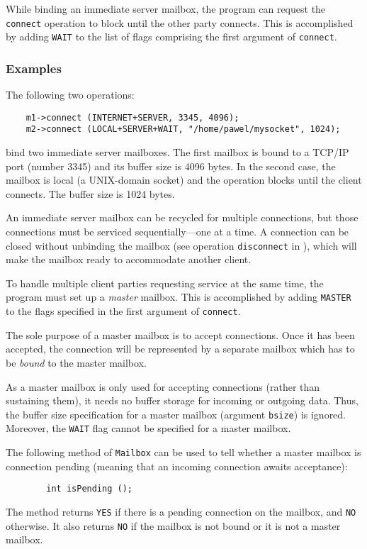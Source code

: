While binding an immediate server mailbox, the program can
request the {\tt connect} operation to block until the other party connects.
This is accomplished by adding {\tt WAIT} to the list of flags
comprising the first argument of {\tt connect}.

\subsubsection*{Examples}

\noindent
The following two operations:
\begin{verbatim}
    m1->connect (INTERNET+SERVER, 3345, 4096);
    m2->connect (LOCAL+SERVER+WAIT, "/home/pawel/mysocket", 1024);
\end{verbatim}
bind two immediate server mailboxes.
The first mailbox is bound to a TCP/IP port (number 3345) and its buffer
size is 4096 bytes.
In the second case, the mailbox is local (a UNIX-domain socket) and the
operation blocks until the client connects.
The buffer size is 1024 bytes.

\medskip

\noindent
An immediate server mailbox can be recycled for multiple connections,
but those connections must be serviced sequentially---one at a time.
A connection can be closed without unbinding the
mailbox (see operation {\tt disconnect} in ),
which will make the mailbox ready to accommodate another client.

To handle multiple client parties requesting
service at the same time, the program must set up a {\em master\/} mailbox.
This is accomplished by adding {\tt MASTER} to the flags specified in the
first argument of {\tt connect}.

The sole purpose of a master mailbox is to accept connections.
Once it has been accepted, the connection will be represented by a
separate mailbox which has to be {\em bound\/} to the master mailbox.

As a master mailbox is only used for accepting connections (rather
than sustaining them), it needs no buffer storage for incoming or
outgoing data.
Thus, the buffer size specification for a master mailbox
(argument {\tt bsize}) is ignored.
Moreover, the {\tt WAIT} flag cannot be specified for a master mailbox.

The following method of {\tt Mailbox} can be used to tell whether
a master mailbox is connection pending (meaning that an incoming
connection awaits acceptance):
\begin{verbatim}
        int isPending ();
\end{verbatim}
The method returns {\tt YES} if there is a pending connection on the mailbox,
and {\tt NO} otherwise.
It also returns {\tt NO} if the mailbox is not bound or it is not a
master mailbox.

